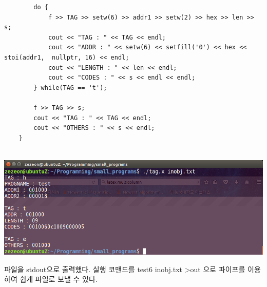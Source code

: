 \documentclass[12pt,a4paper]{article}
\begin{document}
\begin{enumerate}
\begin{lstlisting}
		do {
			f >> TAG >> setw(6) >> addr1 >> setw(2) >> hex >> len >> s;
			cout << "TAG : " << TAG << endl;
			cout << "ADDR : " << setw(6) << setfill('0') << hex << stoi(addr1, 	nullptr, 16) << endl;
			cout << "LENGTH : " << len << endl;
			cout << "CODES : " << s << endl << endl;
		} while(TAG == 't');
		
		f >> TAG >> s;
		cout << "TAG : " << TAG << endl;
		cout << "OTHERS : " << s << endl;
	}
	
\end{lstlisting}

\includegraphics[width=\textwidth]{test6.png}
\end{enumerate}
{}
\indent
파일을 stdout으로 출력했다. 실행 코맨드를 test6 inobj.txt \textgreater out 으로 파이프를 이용하여 쉽게 파일로 보낼 수 있다.
\end{document}
